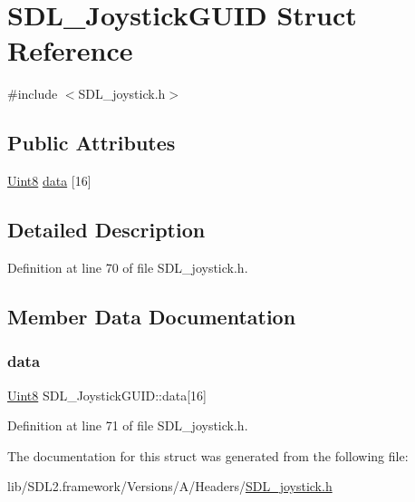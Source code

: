 \hypertarget{struct_s_d_l___joystick_g_u_i_d}{}\section{S\+D\+L\+\_\+\+Joystick\+G\+U\+ID Struct Reference}
\label{struct_s_d_l___joystick_g_u_i_d}


{\ttfamily \#include $<$S\+D\+L\+\_\+joystick.\+h$>$}

\subsection*{Public Attributes}
\begin{DoxyCompactItemize}
\item 
\mbox{\hyperlink{_s_d_l__stdinc_8h_a2944638813a090aa23e62f4da842c3e2}{Uint8}} \mbox{\hyperlink{struct_s_d_l___joystick_g_u_i_d_a16935b928a608fe98e0509f242590597}{data}} \mbox{[}16\mbox{]}
\end{DoxyCompactItemize}


\subsection{Detailed Description}


Definition at line 70 of file S\+D\+L\+\_\+joystick.\+h.



\subsection{Member Data Documentation}
\mbox{\label{struct_s_d_l___joystick_g_u_i_d_a16935b928a608fe98e0509f242590597}} 
\subsubsection{\texorpdfstring{data}{data}}
{\footnotesize\ttfamily \mbox{\hyperlink{_s_d_l__stdinc_8h_a2944638813a090aa23e62f4da842c3e2}{Uint8}} S\+D\+L\+\_\+\+Joystick\+G\+U\+I\+D\+::data\mbox{[}16\mbox{]}}



Definition at line 71 of file S\+D\+L\+\_\+joystick.\+h.



The documentation for this struct was generated from the following file\+:\begin{DoxyCompactItemize}
\item 
lib/\+S\+D\+L2.\+framework/\+Versions/\+A/\+Headers/\mbox{\hyperlink{_s_d_l__joystick_8h}{S\+D\+L\+\_\+joystick.\+h}}\end{DoxyCompactItemize}
